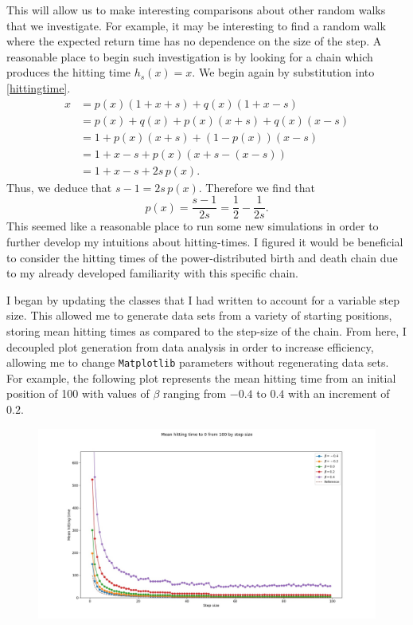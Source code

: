 This will allow us to make interesting comparisons about other random walks that we investigate. For
example, it may be interesting to find a random walk where the expected return time has no dependence on
the size of the step. A reasonable place to begin such investigation is by looking for a chain which
produces the hitting time $h_s(x) = x$. We begin again by substitution into \eqref{hittingtime}.
\begin{align*}
    x &= p(x)(1 + x + s) + q(x)(1 + x - s) \\
      &= p(x) + q(x) + p(x)(x+s) + q(x)(x-s) \\
      &= 1 + p(x)(x+s) + (1-p(x))(x-s) \\
      &= 1 + x - s + p(x)(x+s - (x - s)) \\
      &= 1 + x - s + 2s\, p(x).
\end{align*}
Thus, we deduce that $s - 1 = 2s\, p(x)$. Therefore we find that
\[
    p(x) = \frac{s-1}{2s} = \frac{1}{2} - \frac{1}{2s}.
\]
This seemed like a reasonable place to run some new simulations in order to further develop my
intuitions about hitting-times. I figured it would be beneficial to consider the hitting times of the
power-distributed birth and death chain due to my already developed familiarity with this specific
chain.

I began by updating the classes that I had written to account for a variable step size. This allowed me
to generate data sets from a variety of starting positions, storing mean hitting times as compared to
the step-size of the chain. From here, I decoupled plot generation from data analysis in order to
increase efficiency, allowing me to change \texttt{Matplotlib} parameters without regenerating data
sets. For example, the following plot represents the mean hitting time from an initial position of 100
with values of $\beta$ ranging from $-0.4$ to $0.4$ with an increment of $0.2$.

\noindent
\begin{figure}[H]
    \includegraphics[width=\textwidth]{plots/hittingtimesplot1.jpg}
    \centering
\end{figure}

